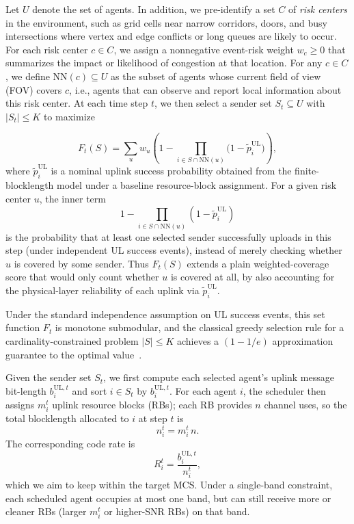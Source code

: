 \documentclass[conference]{IEEEtran}
\begin{document}
Let $U$ denote the set of agents. In addition, we pre-identify a set $C$ of \emph{risk centers} in the environment, such as grid cells near narrow corridors, doors, and busy intersections where vertex and edge conflicts or long queues are likely to occur. For each risk center $c \in C$, we assign a nonnegative event-risk weight $w_c \ge 0$ that summarizes the impact or likelihood of congestion at that location. For any $c \in C$, we define $\mathrm{NN}(c) \subseteq U$ as the subset of agents whose current field of view (FOV) covers $c$, i.e., agents that can observe and report local information about this risk center. At each time step $t$, we then select a sender set $S_t \subseteq U$ with $|S_t| \le K$ to maximize

\[
F_t(S)=\sum_{u} w_u\!\left(1-\prod_{i\in S\cap \mathrm{NN}(u)}\big(1-\tilde p^{\mathrm{UL}}_{i}\big)\right),
\]
where $\tilde p^{\mathrm{UL}}_{i}$ is a nominal uplink success probability obtained from the finite-blocklength model under a baseline resource-block assignment. For a given risk center $u$, the inner term
\[
1-\prod_{i\in S\cap \mathrm{NN}(u)}(1-\tilde p^{\mathrm{UL}}_{i})
\]
is the probability that at least one selected sender successfully uploads in this step (under independent UL success events), instead of merely checking whether $u$ is covered by some sender. Thus $F_t(S)$ extends a plain weighted-coverage score that would only count whether $u$ is covered at all, by also accounting for the physical-layer reliability of each uplink via $\tilde p^{\mathrm{UL}}_{i}$.

Under the standard independence assumption on UL success events, this set function $F_t$ is monotone submodular, and the classical greedy selection rule for a cardinality-constrained problem $\lvert S\rvert \le K$ achieves a $(1-1/e)$ approximation guarantee to the optimal value~\cite{nemhauser1978analysis,krause2014submodular}.


Given the sender set $S_t$, we first compute each selected agent’s uplink message bit-length $b_i^{\mathrm{UL},t}$ and sort $i \in S_t$ by $b_i^{\mathrm{UL},t}$. For each agent $i$, the scheduler then assigns $m_i^t$ uplink resource blocks (RBs); each RB provides $n$ channel uses, so the total blocklength allocated to $i$ at step $t$ is
\[
n_i^t = m_i^t\, n.
\]
The corresponding code rate is
\[
R_i^t = \frac{b_i^{\mathrm{UL},t}}{n_i^t},
\]
which we aim to keep within the target MCS. Under a single-band constraint, each scheduled agent occupies at most one band, but can still receive more or cleaner RBs (larger $m_i^t$ or higher-SNR RBs) on that band.
\end{document}
